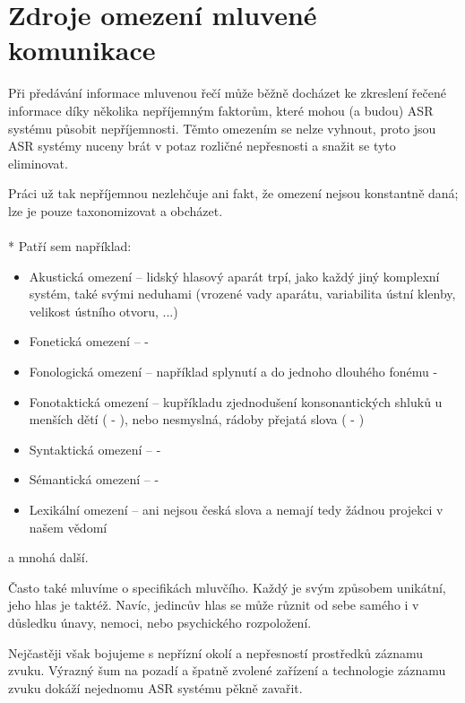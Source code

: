\section{Zdroje omezení mluvené komunikace}

Při předávání informace mluvenou řečí může běžně docházet ke zkreslení řečené informace díky několika nepříjemným faktorům, které mohou (a budou) ASR systému působit nepříjemnosti. Těmto omezením se nelze vyhnout, proto jsou ASR systémy nuceny brát v potaz rozličné nepřesnosti a snažit se tyto eliminovat.

Práci už tak nepříjemnou nezlehčuje ani fakt, že omezení nejsou konstantně daná; lze je pouze taxonomizovat a obcházet.
\\\\*
Patří sem například:

\begin{itemize}
\item Akustická omezení -- lidský hlasový aparát trpí, jako každý jiný komplexní systém, také svými neduhami (vrozené vady aparátu, variabilita ústní klenby, velikost ústního otvoru, ...)
\item Fonetická omezení --  - 
\item Fonologická omezení -- například splynutí  a  do jednoho dlouhého fonému - 
\item Fonotaktická omezení -- kupříkladu zjednodušení konsonantických shluků u menších dětí ( - ), nebo nesmyslná, rádoby přejatá slova ( - )
\item Syntaktická omezení --  - 
\item Sémantická omezení --  - 
\item Lexikální omezení --  ani  nejsou česká slova a nemají tedy žádnou projekci v našem vědomí
\end{itemize}

a mnohá další.

Často také mluvíme o specifikách mluvčího. Každý je svým způsobem unikátní, jeho hlas je taktéž. Navíc, jedincův hlas se může různit od sebe samého i v důsledku únavy, nemoci, nebo psychického rozpoložení.

Nejčastěji však bojujeme s nepřízní okolí a nepřesností prostředků záznamu zvuku. Výrazný šum na pozadí a špatně zvolené zařízení a technologie záznamu zvuku dokáží nejednomu ASR systému pěkně zavařit.

